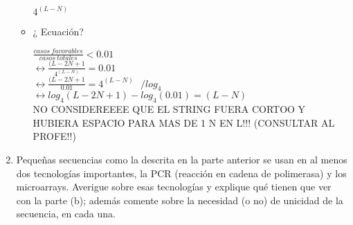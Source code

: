 \begin{enumerate}
\begin{itemize}
$4^{(L-N)}$

\item ¿ Ecuación?

$\frac{casos \ favorables}{casos \ totales} < 0.01$\\
$\leftrightarrow \frac{(L - 2N + 1}{4^{(L-N)}} = 0.01$\\
$\leftrightarrow \frac{(L - 2N + 1}{0.01} = 4^{(L-N)} \ \ \ / log_4$\\
$\leftrightarrow log_4(L - 2N + 1) - log_4(0.01) = (L-N)$\\

NO CONSIDEREEEE QUE EL STRING FUERA CORTOO Y HUBIERA ESPACIO PARA MAS DE 1 N EN L!!! (CONSULTAR AL PROFE!!)


\end{itemize}


\item Pequeñas secuencias como la descrita en la parte anterior se usan en al menos dos tecnologías
importantes, la PCR (reacción en cadena de polimerasa) y los microarrays. Averigue sobre esas
tecnologías y explique qué tienen que ver con la parte (b); además comente sobre la necesidad (o no) de
unicidad de la secuencia, en cada una.


\end{enumerate}
